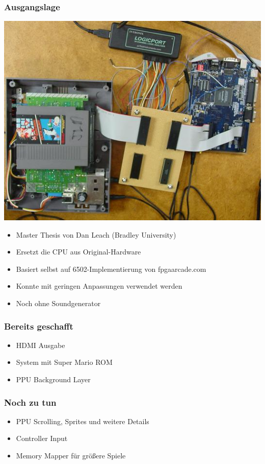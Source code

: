 \documentclass{beamer}
\begin{document}
    \begin{frame}
        \frametitle{Ausgangslage}
            \begin{block}{5cm}
                \includegraphics{img/danleach.jpg}
            \end{block}
                \begin{itemize}
                    \item{Master Thesis von Dan Leach (Bradley University)}
                    \item{Ersetzt die CPU aus Original-Hardware}
                    \item{Basiert selbst auf 6502-Implementierung von fpgaarcade.com}
                    \item{Konnte mit geringen Anpassungen verwendet werden}
                    \item{Noch ohne Soundgenerator}
                \end{itemize}
    \end{frame}
    
    
    \begin{frame}
        \frametitle{Bereits geschafft}
        \begin{itemize}
            \item{HDMI Ausgabe}
            \item{System mit Super Mario ROM}
            \item{PPU Background Layer}
        \end{itemize}
    \end{frame}
    
    \begin{frame}
        \frametitle{Noch zu tun}
        \begin{itemize}
            \item{PPU Scrolling, Sprites und weitere Details}
            \item{Controller Input}
            \item{Memory Mapper für größere Spiele}
        \end{itemize}
    \end{frame}
    
\end{document}
